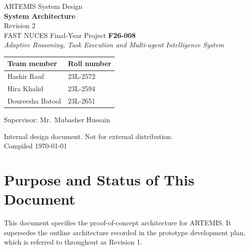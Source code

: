 \documentclass[11pt]{article}
\begin{document}
\begin{titlepage}
\centering
\vspace*{1.5cm}
{\Large ARTEMIS System Design}\\[0.4cm]
{\LARGE\bfseries System Architecture}\\[0.3cm]
{\large Revision 2}\\[0.6cm]
{\large FAST NUCES Final-Year Project \textbf{F26-008}}\\[0.2cm]
{\small \textit{Adaptive Reasoning, Task Execution and Multi-agent Intelligence System}}\\[1.1cm]

\begin{tabular}{@{}ll@{}}
\toprule
Team member & Roll number \\
\midrule
Hashir Rauf & 23L-2572 \\
Hira Khalid & 23L-2594 \\
Doureesha Batool & 23L-2651 \\
\bottomrule
\end{tabular}

\vspace{0.7cm}

{\normalsize Supervisor: Mr.\ Mubasher Hussain}

\vfill
{\normalsize Internal design document. Not for external distribution.}\\[0.3cm]
{\normalsize Compiled \today}
\end{titlepage}

\setcounter{page}{1}
\tableofcontents
\clearpage
{}
\setcounter{page}{1}

\section{Purpose and Status of This Document}

This document specifies the proof-of-concept architecture for ARTEMIS. It supersedes the
outline architecture recorded in the prototype development plan, which is referred to
throughout as Revision 1.
\end{document}
